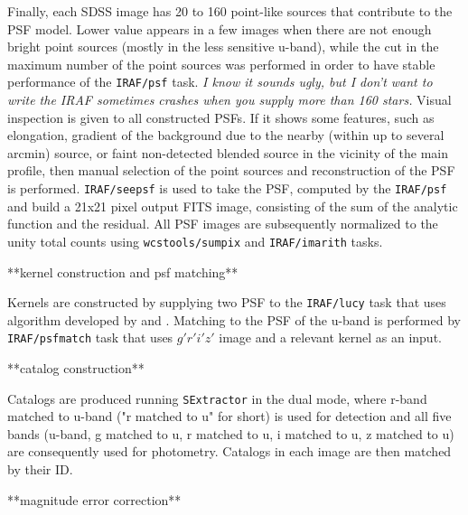 \documentclass[numberedappendix,apj,twocolumn]{emulateapj}
\begin{document}
Finally, each SDSS image has 20 to 160 point-like sources that contribute to the PSF model. Lower value appears in a few images when there are not enough bright point sources (mostly in the less sensitive u-band), while the cut in the maximum number of the point sources was performed in order to have stable performance of the {\tt IRAF/psf} task. \textit{I know it sounds ugly, but I don't want to write the IRAF sometimes  crashes when you supply more than 160 stars.} Visual inspection is given to all constructed PSFs. If it shows some features, such as elongation, gradient of the background due to the nearby (within up to several arcmin) source, or faint non-detected blended source in the vicinity of the main profile, then manual selection of the point sources and reconstruction of the PSF is performed. {\tt IRAF/seepsf} is used to take the PSF, computed by the {\tt IRAF/psf} and build a 21x21 pixel output FITS image, consisting of the sum of the analytic function and the residual. All PSF images are subsequently normalized to the unity total counts using {\tt wcstools/sumpix} \citep{Mink1998b} and {\tt IRAF/imarith} tasks. 

**kernel construction and psf matching**

Kernels are constructed by supplying two PSF to the {\tt IRAF/lucy} task that uses algorithm developed by \citet{Richardson1972} and \citet{Lucy1974}. Matching to the PSF of the u-band is performed by {\tt IRAF/psfmatch} task that uses $g'r'i'z'$ image and a relevant kernel as an input.

**catalog construction**

Catalogs are produced running {\tt SExtractor} in the dual mode, where r-band matched to u-band ("r matched to u" for short) is used for detection and all five bands (u-band, g matched to u, r matched to u, i matched to u, z matched to u) are consequently used for photometry. Catalogs in each image are then matched by their ID.

**magnitude error correction**
\end{document}
